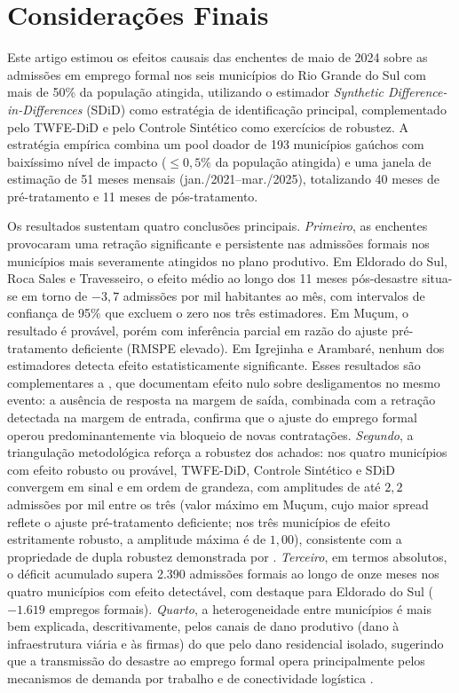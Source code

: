 \documentclass[a4paper,12pt]{article}
\begin{document}
\section{Considerações Finais}
\label{sec:consideracoes}

Este artigo estimou os efeitos causais das enchentes de maio de 2024 sobre as admissões
em emprego formal nos seis municípios do Rio Grande do Sul com mais de 50\% da
população atingida, utilizando o estimador \textit{Synthetic Difference-in-Differences}
(SDiD) como estratégia de identificação principal, complementado pelo TWFE-DiD e pelo
Controle Sintético como exercícios de robustez. A estratégia empírica combina um pool
doador de 193 municípios gaúchos com baixíssimo nível de impacto ($\leq 0{,}5\%$ da
população atingida) e uma janela de estimação de 51 meses mensais (jan./2021–mar./2025),
totalizando 40 meses de pré-tratamento e 11 meses de pós-tratamento.

Os resultados sustentam quatro conclusões principais. \emph{Primeiro}, as enchentes
provocaram uma retração significante e persistente nas admissões formais nos municípios
mais severamente atingidos no plano produtivo. Em Eldorado do Sul, Roca Sales e
Travesseiro, o efeito médio ao longo dos 11 meses pós-desastre situa-se em torno de
$-3{,}7$ admissões por mil habitantes ao mês, com intervalos de confiança de 95\% que
excluem o zero nos três estimadores. Em Muçum, o resultado é provável, porém com
inferência parcial em razão do ajuste pré-tratamento deficiente (RMSPE elevado). Em
Igrejinha e Arambaré, nenhum dos estimadores detecta efeito estatisticamente significante.
Esses resultados são complementares a , que documentam efeito
nulo sobre desligamentos no mesmo evento: a ausência de resposta na margem de saída,
combinada com a retração detectada na margem de entrada, confirma que o ajuste do
emprego formal operou predominantemente via bloqueio de novas contratações.
\emph{Segundo}, a triangulação metodológica reforça a robustez dos achados: nos quatro
municípios com efeito robusto ou provável, TWFE-DiD, Controle Sintético e SDiD convergem
em sinal e em ordem de grandeza, com amplitudes de até $2{,}2$ admissões por mil entre os três
(valor máximo em Muçum, cujo maior spread reflete o ajuste pré-tratamento
deficiente; nos três municípios de efeito estritamente robusto, a amplitude
máxima é de $1{,}00$), consistente com a propriedade de dupla robustez
demonstrada por . \emph{Terceiro}, em termos absolutos, o déficit acumulado
supera 2.390 admissões formais ao longo de onze meses nos quatro municípios com efeito
detectável, com destaque para Eldorado do Sul ($-1.619$ empregos formais). \emph{Quarto},
a heterogeneidade entre municípios é mais bem explicada, descritivamente, pelos canais de
dano produtivo (dano à infraestrutura viária e às firmas) do que pelo dano residencial
isolado, sugerindo que a transmissão do desastre ao emprego formal opera principalmente
pelos mecanismos de demanda por trabalho \cite{haddad2015economic} e de conectividade
logística \cite{xiao2014}.
\end{document}
